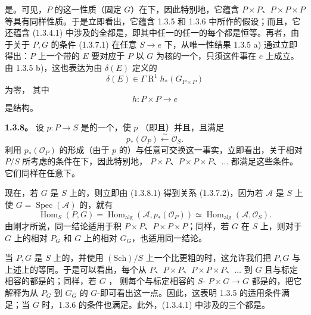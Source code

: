 是。可见，$P$ 的这一性质（固定 $G$）在下，因此特别地，它蕴含 $P\times P$、$P\times P\times P$ 等具有同样性质。于是立即看出，它蕴含 1.3.5 和 1.3.6 中所作的假设；而且，它还蕴含 (1.3.4.1) 中涉及的全都是，即其中任一的任一的每个都是恒等。再者，由于关于 $P,G$ 的条件 (1.3.7.1) 在任意 $S\to e$ 下，从唯一性结果 1.3.5 a) 通过立即得出：$P$ 上一个带的 $E$ 要对应于 $P$ 以 $G$ 为核的一个，只须这件事在 $e$ 上成立。由 1.3.5 b)，这也表达为由 $\delta(E)$ 定义的
\[
\delta(E)\in\Gamma\operatorname{R}^1h_*(G_{P\times P})
\]
为零，
其中
\[
h:P\times P\longrightarrow e
\]
是结构。

\textbf{1.3.8。} 设 $p:P\to S$ 是的一个，使 $p$ （即且）并且，且满足
\[
p_*(\mathcal O_P)\xleftarrow{\sim}\mathcal O_S.
\tag{1.3.8.1}
\]
利用 $p_*(\mathcal O_P)$ 的形成（由于 $p$ 的）与任意可交换这一事实，立即看出，关于相对 $P/S$ 所考虑的条件在下，因此特别地， $P\times P$、$P\times P\times P$、$\ldots$ 都满足这些条件。它们同样在任意下。

现在，若 $G$ 是 $S$ 上的，则立即由 (1.3.8.1) 得到关系 (1.3.7.2)，因为若 $\mathcal A$ 是 $S$ 上使 $G=\operatorname{Spec}(\mathcal A)$ 的，就有
\[
\operatorname{Hom}_S(P,G)
=\operatorname{Hom}_{\mathrm{alg}}(\mathcal A,p_*(\mathcal O_P))
\simeq\operatorname{Hom}_{\mathrm{alg}}(\mathcal A,\mathcal O_S).
\]
由刚才所说，同一结论适用于积 $P\times P$、$P\times P\times P$；同样，若 $G$ 在 $S$ 上，则对于 $G$ 上的相对 $P_G$ 和 $G$ 上的相对 $G_G$，也适用同一结论。

当 $P,G$ 是 $S$ 上的，并使用 $(\mathrm{Sch})/S$ 上一个比更粗的时，这允许我们把 $P,G$ 与上述上的等同。于是可以看出，每个从 $P$、$P\times P$、$P\times P\times P$、$\ldots$ 到 $G$ 且与标定相容的都是的；同样，若 $G$ ，
则每个与标定相容的 $S$- $P\times G\to G$ 都是的，把它解释为从 $P_G$ 到 $G_G$ 的 $G$-即可看出这一点。因此，这表明 1.3.5 的适用条件满足；当 $G$ 时，1.3.6 的条件也满足。此外，(1.3.4.1) 中涉及的三个都是。

